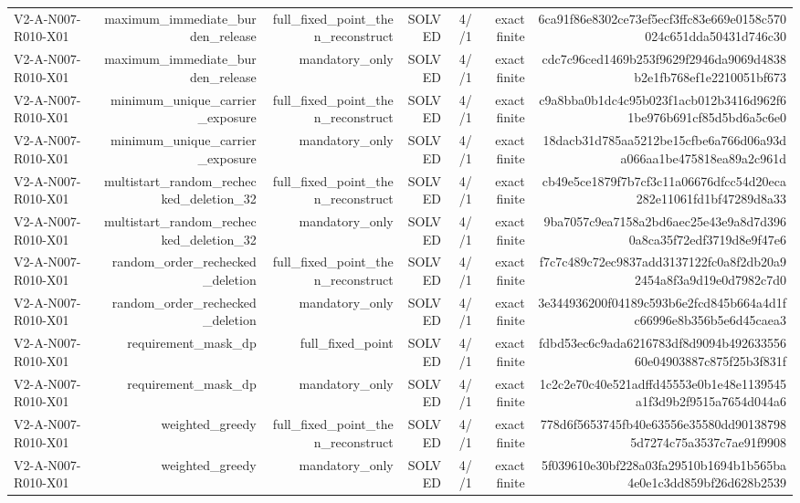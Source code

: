 {\begin{longtable}{lrrrrrr}
V2-A-N007-R010-X01 & maximum\_immediate\_burden\_release & full\_fixed\_point\_then\_reconstruct & SOLVED & 4//1 & exact finite & 6ca91f86e8302ce73ef5ecf3ffc83e669e0158c570024c651dda50431d746c30 \\
V2-A-N007-R010-X01 & maximum\_immediate\_burden\_release & mandatory\_only & SOLVED & 4//1 & exact finite & cdc7c96ced1469b253f9629f2946da9069d4838b2e1fb768ef1e2210051bf673 \\
V2-A-N007-R010-X01 & minimum\_unique\_carrier\_exposure & full\_fixed\_point\_then\_reconstruct & SOLVED & 4//1 & exact finite & c9a8bba0b1dc4c95b023f1acb012b3416d962f61be976b691cf85d5bd6a5c6e0 \\
V2-A-N007-R010-X01 & minimum\_unique\_carrier\_exposure & mandatory\_only & SOLVED & 4//1 & exact finite & 18dacb31d785aa5212be15cfbe6a766d06a93da066aa1be475818ea89a2c961d \\
V2-A-N007-R010-X01 & multistart\_random\_rechecked\_deletion\_32 & full\_fixed\_point\_then\_reconstruct & SOLVED & 4//1 & exact finite & cb49e5ce1879f7b7cf3c11a06676dfcc54d20eca282e11061fd1bf47289d8a33 \\
V2-A-N007-R010-X01 & multistart\_random\_rechecked\_deletion\_32 & mandatory\_only & SOLVED & 4//1 & exact finite & 9ba7057c9ea7158a2bd6aec25e43e9a8d7d3960a8ca35f72edf3719d8e9f47e6 \\
V2-A-N007-R010-X01 & random\_order\_rechecked\_deletion & full\_fixed\_point\_then\_reconstruct & SOLVED & 4//1 & exact finite & f7c7c489c72ec9837add3137122fc0a8f2db20a92454a8f3a9d19e0d7982c7d0 \\
V2-A-N007-R010-X01 & random\_order\_rechecked\_deletion & mandatory\_only & SOLVED & 4//1 & exact finite & 3e344936200f04189c593b6e2fcd845b664a4d1fc66996e8b356b5e6d45caea3 \\
V2-A-N007-R010-X01 & requirement\_mask\_dp & full\_fixed\_point & SOLVED & 4//1 & exact finite & fdbd53ec6c9ada6216783df8d9094b49263355660e04903887c875f25b3f831f \\
V2-A-N007-R010-X01 & requirement\_mask\_dp & mandatory\_only & SOLVED & 4//1 & exact finite & 1c2c2e70c40e521adffd45553e0b1e48e1139545a1f3d9b2f9515a7654d044a6 \\
V2-A-N007-R010-X01 & weighted\_greedy & full\_fixed\_point\_then\_reconstruct & SOLVED & 4//1 & exact finite & 778d6f5653745fb40e63556e35580dd901387985d7274c75a3537c7ae91f9908 \\
V2-A-N007-R010-X01 & weighted\_greedy & mandatory\_only & SOLVED & 4//1 & exact finite & 5f039610e30bf228a03fa29510b1694b1b565ba4e0e1c3dd859bf26d628b2539 \\

\end{longtable}}
